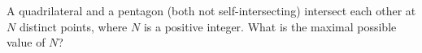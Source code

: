 A quadrilateral and a pentagon (both not self-intersecting) intersect each other at $N$ distinct points, where $N$ is a positive integer. What is the maximal possible value of $N$?
